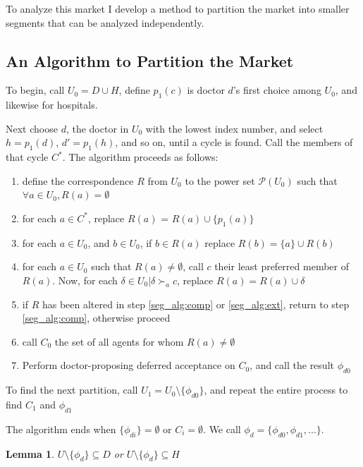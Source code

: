 \documentclass[WP]{AEA}
\newtheorem{lemma}{Lemma}
\begin{document}
To analyze this market I develop a method to partition the market into smaller segments that can be analyzed independently.


\subsection{An Algorithm to Partition the Market} \label{subsect:partition}

To begin, call $U_0 = D \cup H$, define $p_1(c)$ is doctor $d$'s first choice among $U_0$, and likewise for hospitals.

Next choose $d$, the doctor in $U_0$ with the lowest index number, and select $h = p_1(d)$, $d' = p_1(h)$, and so on, until a cycle is found. Call the members of that cycle $C^*$.  The algorithm proceeds as follows: 


\begin{enumerate}
	\item define the correspondence $R$ from $U_0$ to the power set $\mathcal{P}(U_0)$ such that $\forall a \in U_0, R(a) = \emptyset$
	\item for each $a \in C^*$, replace $R(a)$ =  $R(a) \cup \{p_1(a)\}$
	\item  \label{seg_alg:comp} for each $a \in U_0$, and $b \in U_0$, if $ b \in R(a)$ replace $R(b) = \{a\} \cup R(b)$
	\item  \label{seg_alg:ext} for each $a \in U_0$ such that $R(a) \neq \emptyset$, call  $c$ their least preferred member of $R(a)$. Now, for each $\delta \in U_0 | \delta \succ_a c$, replace $R(a) = R(a) \cup \delta$ 
	\item if $R$ has been altered in step \ref*{seg_alg:comp} or \ref*{seg_alg:ext}, return to step \ref*{seg_alg:comp}, otherwise proceed
	\item call $C_0$ the set of all agents for whom $R(a) \neq \emptyset$
	\item Perform doctor-proposing deferred acceptance on $C_0$, and call the result $\phi_{d0}$
\end{enumerate}

To find the next partition, call $U_1 = U_0 \setminus \{\phi_{d0}\}$, and repeat the entire process to find $C_1$ and $\phi_{d1}$

The algorithm ends when $\{\phi_{di}\} = \emptyset$ or $C_i= \emptyset$.  We call $\phi_d = \{\phi_{d0}, \phi_{d1}, ...\}$.

\begin{lemma}
	$ U \setminus \{\phi_{d}\} \subseteq D$ or $ U \setminus \{\phi_{d}\} \subseteq H$ 
\end{lemma}
\end{document}

